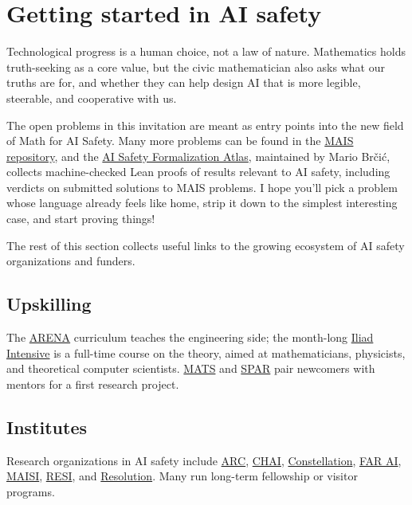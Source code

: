 \section{Getting started in AI safety}
\label{sec:conclusion}

Technological progress is a human choice, not a law of nature. Mathematics holds truth-seeking as a core value, but the civic mathematician also asks what our truths are for, and whether they can help design AI that is more legible, steerable, and cooperative with us.

The open problems in this invitation are meant as entry points into the new field of Math for AI Safety. Many more problems can be found in the \href{https://github.com/lionellevine/MAIS/blob/main/open-problems/README.md}{MAIS repository}, and the \href{https://mbrcic.github.io/ai-safety-formalization-atlas/}{AI Safety Formalization Atlas}, maintained by Mario Br\v{c}i\'c, collects machine-checked Lean proofs of results relevant to AI safety, including verdicts on submitted solutions to MAIS problems. I hope you'll pick a problem whose language already feels like home, strip it down to the simplest interesting case, and start proving things!

The rest of this section collects useful links to the growing ecosystem of AI safety organizations and funders.

\subsection*{Upskilling}
The \href{https://www.arena.education/}{ARENA} curriculum teaches the engineering side; the month-long \href{https://www.iliad.ac/intensive}{Iliad Intensive} is a full-time course on the theory, aimed at mathematicians, physicists, and theoretical computer scientists. \href{https://www.matsprogram.org/}{MATS} and \href{https://sparai.org/}{SPAR} pair newcomers with mentors for a first research project.

\subsection*{Institutes}
Research organizations in AI safety include \href{https://www.alignment.org/}{ARC}, \href{https://humancompatible.ai/}{CHAI}, \href{https://constellation.org/}{Constellation}, \href{https://www.far.ai/}{FAR AI}, \href{https://maisi.org/}{MAISI}, \href{https://resi.org/}{RESI}, and \href{https://resolution.org}{Resolution}. Many run long-term fellowship or visitor programs.

